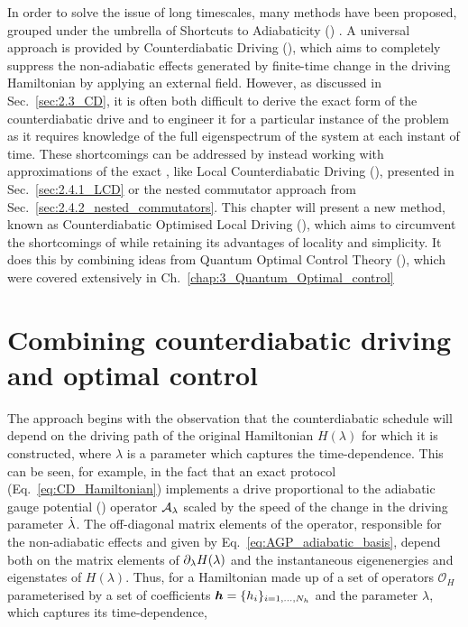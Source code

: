 In order to solve the issue of long timescales, many methods have been proposed, grouped under the umbrella of Shortcuts to Adiabaticity () \cite{guery-odelin_shortcuts_2019}. A universal approach is provided by Counterdiabatic Driving (), which aims to completely suppress the non-adiabatic effects generated by finite-time change in the driving Hamiltonian by applying an external field. However, as discussed in Sec.~\ref{sec:2.3_CD}, it is often both difficult to derive the exact form of the counterdiabatic drive and to engineer it for a particular instance of the problem as it requires knowledge of the full eigenspectrum of the system at each instant of time. These shortcomings can be addressed by instead working with approximations of the exact , like Local Counterdiabatic Driving (), presented in Sec.~\ref{sec:2.4.1_LCD} or the nested commutator approach from Sec.~\ref{sec:2.4.2_nested_commutators}. 
\fi
This chapter will present a new method, known as Counterdiabatic Optimised Local Driving (), which aims to circumvent the shortcomings of  while retaining its advantages of locality and simplicity. It does this by combining ideas from Quantum Optimal Control Theory (), which were covered extensively in Ch.~\ref{chap:3_Quantum_Optimal_control}

\section{Combining counterdiabatic driving and optimal control}

The  approach begins with the observation that the counterdiabatic schedule will depend on the driving path of the original Hamiltonian $H(\lambda)$ for which it is constructed, where $\lambda$ is a parameter which captures the time-dependence. This can be seen, for example, in the fact that an exact  protocol (Eq.~\eqref{eq:CD_Hamiltonian}) implements a drive proportional to the adiabatic gauge potential () operator $\mathcal{A}_{\lambda}$ scaled by the speed of the change in the driving parameter $\dot{\lambda}$. The off-diagonal matrix elements of the  operator, responsible for the non-adiabatic effects and  given by Eq.~\eqref{eq:AGP_adiabatic_basis}, depend both on the matrix elements of $\partial_{\lambda} H(\lambda)$ and the instantaneous eigenenergies and eigenstates of $H(\lambda)$. Thus, for a Hamiltonian made up of a set of operators $\mathcal{O}_{H}$ parameterised by a set of coefficients $\boldsymbol{h} = \{h_i\}_{i = 1, ..., N_h}$  and the parameter $\lambda$, which captures its time-dependence, 

